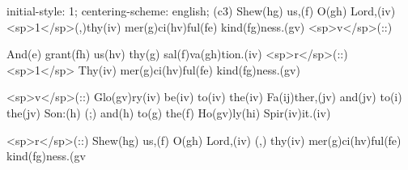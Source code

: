 initial-style: 1;
centering-scheme: english;
(c3) Shew(hg) us,(f) O(gh) Lord,(iv) <sp>1</sp>(,)thy(iv) mer(g)ci(hv)ful(fe) kind(fg)ness.(gv) <sp>v</sp>(::)

And(e) grant(fh) us(hv) thy(g) sal(f)va(gh)tion.(iv) <sp>r</sp>(::) <sp>1</sp> Thy(iv) mer(g)ci(hv)ful(fe) kind(fg)ness.(gv)

<sp>v</sp>(::) Glo(gv)ry(iv) be(iv) to(iv) the(iv) Fa(ij)ther,(jv) and(jv) to(i) the(jv) Son:(h) (;) and(h) to(g) the(f) Ho(gv)ly(hi) Spir(iv)it.(iv)

<sp>r</sp>(::)  Shew(hg) us,(f) O(gh) Lord,(iv) (,) thy(iv) mer(g)ci(hv)ful(fe) kind(fg)ness.(gv